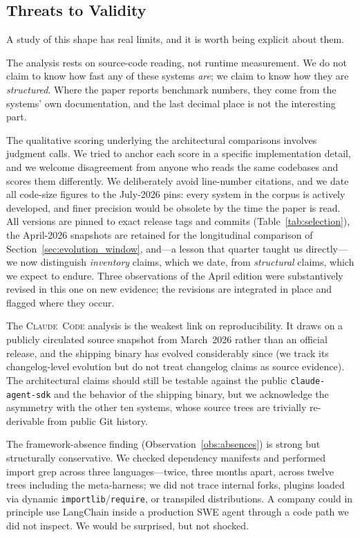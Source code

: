 \documentclass[11pt,a4paper]{article}
\newcommand{\clcode}{\textsc{Claude~Code}\xspace}
\begin{document}
\subsection{Threats to Validity}

A study of this shape has real limits, and it is worth being explicit about them.

The analysis rests on source-code reading, not runtime measurement. We do not claim to know how fast any of these systems \emph{are}; we claim to know how they are \emph{structured}. Where the paper reports benchmark numbers, they come from the systems' own documentation, and the last decimal place is not the interesting part.

The qualitative scoring underlying the architectural comparisons involves judgment calls. We tried to anchor each score in a specific implementation detail, and we welcome disagreement from anyone who reads the same codebases and scores them differently. We deliberately avoid line-number citations, and we date all code-size figures to the July-2026 pins: every system in the corpus is actively developed, and finer precision would be obsolete by the time the paper is read. All versions are pinned to exact release tags and commits (Table~\ref{tab:selection}), the April-2026 snapshots are retained for the longitudinal comparison of Section~\ref{sec:evolution_window}, and---a lesson that quarter taught us directly---we now distinguish \emph{inventory} claims, which we date, from \emph{structural} claims, which we expect to endure. Three observations of the April edition were substantively revised in this one on new evidence; the revisions are integrated in place and flagged where they occur.

The \clcode{} analysis is the weakest link on reproducibility. It draws on a publicly circulated source snapshot from March~2026 rather than an official release, and the shipping binary has evolved considerably since (we track its changelog-level evolution but do not treat changelog claims as source evidence). The architectural claims should still be testable against the public \texttt{claude-agent-sdk} and the behavior of the shipping binary, but we acknowledge the asymmetry with the other ten systems, whose source trees are trivially re-derivable from public Git history.

The framework-absence finding (Observation~\ref{obs:absences}) is strong but structurally conservative. We checked dependency manifests and performed import grep across three languages---twice, three months apart, across twelve trees including the meta-harness; we did not trace internal forks, plugins loaded via dynamic \texttt{importlib}/\texttt{require}, or transpiled distributions. A company could in principle use LangChain inside a production SWE agent through a code path we did not inspect. We would be surprised, but not shocked.
\end{document}
